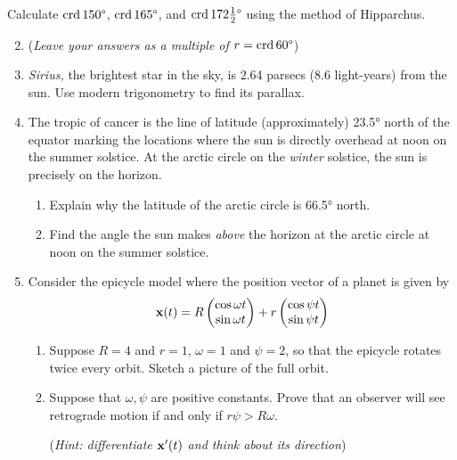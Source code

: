\begin{exercises}{}{}
	\exstart %
	Calculate $\crd\ang{150}$, $\crd\ang{165}$, and $\crd\ang{172\tfrac 12}$ using the method of Hipparchus.\vspace{-5pt}
	\begin{enumerate}\setcounter{enumi}{1}
	  \item[](\emph{Leave your answers as a multiple of $r=\crd\ang{60}$})
	  
	  \item \emph{Sirius,} the brightest star in the sky, is 2.64 parsecs (8.6 light-years) from the sun. Use modern trigonometry to find its parallax.
	
		\item\label{exs:tropicstick1} The tropic of cancer is the line of latitude (approximately) \ang{23.5} north of the equator marking the locations where the sun is directly overhead at noon on the summer solstice.\footnotemark{} At the arctic circle on the \emph{winter} solstice, the sun is precisely on the horizon.
		\begin{enumerate}
		  \item Explain why the latitude of the arctic circle is \ang{66.5} north.
		  \item Find the angle the sun makes \emph{above} the horizon at the arctic circle at noon on the summer solstice.
		\end{enumerate}
	  
	  \item Consider the epicycle model where the position vector of a planet is given by
	  \[
	  	\vx(t)=R\twovec{\cos \omega t}{\sin \omega t}+r\twovec{\cos \psi t}{\sin \psi t}
	  \]
	  \begin{enumerate}
	    \item Suppose $R=4$ and $r=1$, $\omega=1$ and $\psi=2$, so that the epicycle rotates twice every orbit. Sketch a picture of the full orbit.
	    \item Suppose that $\omega,\psi$ are positive constants. Prove that an observer will see retrograde motion if and only if $r\psi>R\omega$.\par
	  	(\emph{Hint: differentiate $\vx'(t)$ and think about its direction})
	  \end{enumerate}
	\end{enumerate}
\end{exercises}


